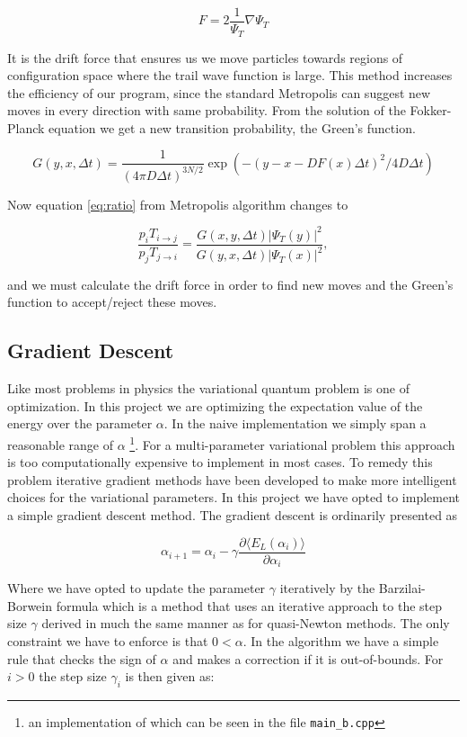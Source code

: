 $$F = 2 \frac{1}{\Psi_T} \nabla \Psi_T$$

It is the drift force that ensures us we move particles towards regions of configuration space where the trail wave function is large. This method increases the efficiency of our program, since the standard Metropolis can suggest new moves in every direction with same probability. 
From the solution of the Fokker-Planck equation we get a new transition probability, the Green's function. 

$$G(y, x, \Delta t) = \frac{1}{(4 \pi D \Delta t)^{3N/2}} \exp (-(y - x - D F(x) \Delta t)^2/4 D \Delta t)$$

Now equation \ref{eq:ratio} from Metropolis algorithm changes to 

$$\frac{p_i T_{i \rightarrow j}}{p_j T_{j \rightarrow i}} = \frac{G(x, y, \Delta t)|\Psi_T(y)|^2}{G(y, x, \Delta t)|\Psi_T(x)|^2},$$

and we must calculate the drift force in order to find new moves and the Green's function to accept/reject these moves.

\subsection{Gradient Descent}

Like most problems in physics the variational quantum problem is one of optimization. In this project we are optimizing the expectation value of the energy over the parameter $\alpha$. In the naive implementation we simply span a reasonable range of $\alpha$ \footnote{an implementation of which can be seen in the file \lstinline{main_b.cpp}}. For a multi-parameter variational problem this approach is too computationally expensive to implement in most cases. To remedy this problem iterative gradient methods have been developed to make more intelligent choices for the variational parameters. In this project we have opted to implement a simple gradient descent method. The gradient descent is ordinarily presented as 

\begin{equation}
\alpha_{i+1} = \alpha_i -\gamma \frac{\partial \langle E_L (\alpha_i) \rangle}{\partial \alpha_i}
\end{equation}

\noindent Where we have opted to update the parameter $\gamma$ iteratively by the Barzilai-Borwein formula which is a method that uses an iterative approach to the step size $\gamma$ derived in much the same manner as for quasi-Newton methods\cite{OptTeory}. The only constraint we have to enforce is that $0 < \alpha$. In the algorithm we have a simple rule  that checks the sign of $\alpha$ and makes a correction if it is out-of-bounds. For $i > 0$ the step size $\gamma_i$ is then given as: 

